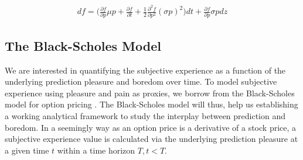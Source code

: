 \documentclass[11pt, onecolumn]{article}
\begin{document}
\begin{equation}
\begin{split}
   df = \bigg(\frac{\partial f}{\partial p} \mu p  + \frac{\partial f}{\partial t} + \frac{1}{2}\frac{\partial ^2 f}{\partial p^2} (\sigma p)^2 \bigg)dt + \frac{\partial f}{\partial p}\sigma p dz
\end{split}
\label{eq:itopr3}
\end{equation}












































\subsection{The Black-Scholes Model}
\label{ss:bsm}

We are interested in quantifying the subjective experience as a function of the underlying prediction pleasure and boredom over time. To model subjective experience using pleasure and pain as proxies, we borrow from the Black-Scholes model for option pricing  \citep{black_pricing_1973}. The Black-Scholes model will thus, help us establishing a working analytical framework to study the interplay between prediction and boredom. In a seemingly way as an option price is a derivative of a stock price, a subjective experience value is calculated via the underlying prediction pleasure at a given time $t$ within a time horizon $T, t < T$. 
 
\end{document}
